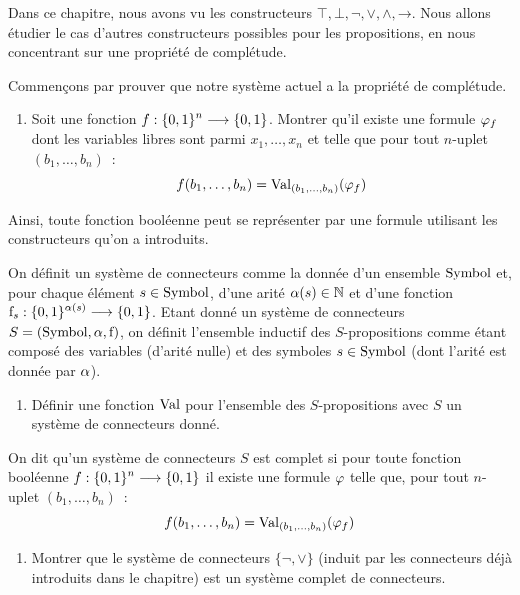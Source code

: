 \begin{exercise}
  Dans ce chapitre, nous avons vu les constructeurs
  $\top,\bot,\mathord{\lnot},\mathord{\lor},\mathord{\land},\mathord{\to}$.
  Nous allons étudier le cas d'autres constructeurs possibles pour les
  propositions, en nous concentrant sur une propriété de complétude.

  Commençons par prouver que notre système actuel a la propriété de complétude.
  \begin{enumerate}[label=(\roman*)]
  \item Soit une fonction $f : \displaystyle \{0,1\}^n \longrightarrow \{0,1\}$. Montrer qu'il
    existe une formule $\varphi_f$ dont les variables libres sont parmi
    $x_1,\ldots,x_n$ et telle que pour tout $n$-uplet $(b_1,\ldots,b_n)$~:
    \[f(b_1,\ldots,b_n) = \operatorname{Val}_{(b_1,\ldots,b_n)}(\varphi_f)\]
  \end{enumerate}
  Ainsi, toute fonction booléenne peut se représenter par une formule utilisant
  les constructeurs qu'on a introduits.

  On définit un système de connecteurs comme la donnée d'un ensemble $\operatorname{Symbol}$
  et, pour chaque élément $s \in \operatorname{Symbol}$, d'une arité $\alpha(s) \in \mathbb N$ et
  d'une fonction $\mathrm{f}_s : \displaystyle \{0,1\}^{\alpha(s)} \longrightarrow \{0,1\}$.
  Etant donné un système de connecteurs $S = (\operatorname{Symbol},\alpha,\mathrm{f})$, on
  définit l'ensemble inductif des $S$-propositions comme étant composé des
  variables (d'arité nulle) et des symboles $s \in \operatorname{Symbol}$ (dont l'arité
  est donnée par $\alpha$).
  \begin{enumerate}[resume,label=(\roman*)]
  \item Définir une fonction $\operatorname{Val}$ pour l'ensemble des $S$-propositions avec
    $S$ un système de connecteurs donné.
  \end{enumerate}

  On dit qu'un système de connecteurs $S$ est complet si pour toute fonction
  booléenne
  $f : \displaystyle \{0,1\}^n \longrightarrow \{0,1\}$ il existe une formule $\varphi$ telle que,
  pour tout $n$-uplet $(b_1,\ldots,b_n)$~:
  \[f(b_1,\ldots,b_n) = \operatorname{Val}_{(b_1,\ldots,b_n)}(\varphi_f)\]
  \begin{enumerate}[resume,label=(\roman*)]
  \item Montrer que le système de connecteurs $\{\lnot,\lor\}$ (induit par les
    connecteurs déjà introduits dans le chapitre) est un système complet de
    connecteurs.
  \end{enumerate}


\end{exercise}
